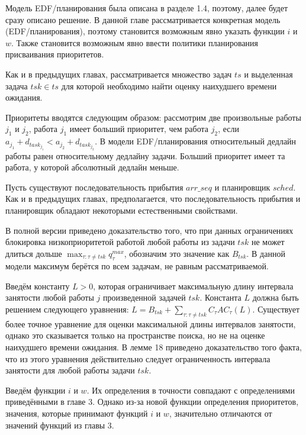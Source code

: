 \documentclass[14pt]{matmex-diploma-custom}
\begin{document}
Модель EDF\-/планирования была описана в разделе 1.4, поэтому, далее будет сразу описано 
  решение. В данной главе рассматривается конкретная модель (EDF\-/планирования), поэтому 
  становится возможным явно указать функции $i$ и $w$. Также становится возможным явно 
  ввести политики планирования присваивания приоритетов.

Как и в предыдущих главах, рассматривается множество задач $ts$ и 
 выделенная задача $tsk \in ts$ для которой необходимо найти оценку 
 наихудшего времени ожидания. 

Приоритеты вводятся следующим образом: рассмотрим две произвольные работы 
  $j_1$ и $j_2$, работа $j_1$ имеет больший приоритет, чем работа $j_2$, 
  если $a_{j_1} + d_{task_{j_1}} < a_{j_2} + d_{task_{j_2}}$. В модели EDF\-/планирования 
  относительный дедлайн работы равен относительному дедлайну задачи. Больший 
  приоритет имеет та работа, у которой абсолютный дедлайн меньше.

Пусть существуют последовательность прибытия $arr\_seq$ и планировщик $sched$. 
  Как и в предыдущих главах, предполагается, что последовательность прибытия и планировщик 
  обладают некоторыми естественными свойствами. 

В полной версии приведено доказательство того, что при данных ограничениях
  блокировка низкоприоритетой работой любой работы 
  из задачи $tsk$ не может длиться дольше $\max_{\tau: \tau \neq tsk} q_{\tau}^{max}$, 
  обозначим это значение как $B_{tsk}$. В данной модели максимум берётся по всем задачам, 
  не равным рассматриваемой.

Введём константу $L > 0$, которая ограничивает максимальную длину интервала занятости 
  любой работы $j$ произведенной задачей $tsk$. Константа $L$ должна быть решением
  следующего уравнения: $L = B_{tsk} + \sum_{\tau: \tau \neq tsk} C_{\tau}AC_{\tau}(L)$.
  Существует более точное уравнение для оценки максимальной длины интервалов занятости, однако 
  это сказывается только на пространстве поиска, но не на оценке наихудшего времени ожидания.
  В лемме 18 приведено доказательство того факта, что из этого уравнения действительно следует 
  ограниченность интервала занятости для любой работы задачи $tsk$. 

Введём функции $i$ и $w$. Их определения
  в точности совпадают с определениями приведёнными в главе 3. Однако из-за 
  новой функции определения приоритетов, значения, которые принимают 
  функций $i$ и $w$, значительно отличаются от значений функций из главы 3.
  
\end{document}
